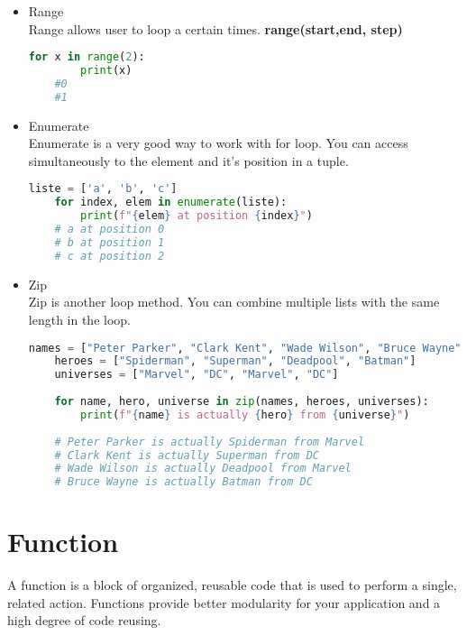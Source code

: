 \documentclass[a4paper, 12pt, titlepage]{scrartcl} %
\begin{document}
\begin{itemize}
    \item Range \\
    Range allows user to loop a certain times. \textbf{range(start,end, step)}
    \begin{lstlisting}[language=Python]
    for x in range(2):
    	print(x)
    #0
    #1
    \end{lstlisting} \vspace{5mm}
    
    \item Enumerate \\
    Enumerate is a very good way to work with for loop. You can access simultaneously to the element and it's position in a tuple.
    \begin{lstlisting}[language=Python]
    liste = ['a', 'b', 'c']
    for index, elem in enumerate(liste):
    	print(f"{elem} at position {index}")
    # a at position 0
    # b at position 1
    # c at position 2
    \end{lstlisting} \vspace{5mm}
    
    \item Zip \\
    Zip is another loop method. You can combine multiple lists with the same length in the loop. 
    \begin{lstlisting}[language=Python]
    names = ["Peter Parker", "Clark Kent", "Wade Wilson", "Bruce Wayne"]
    heroes = ["Spiderman", "Superman", "Deadpool", "Batman"]
    universes = ["Marvel", "DC", "Marvel", "DC"]
    
    for name, hero, universe in zip(names, heroes, universes):
    	print(f"{name} is actually {hero} from {universe}")
    	
    # Peter Parker is actually Spiderman from Marvel
    # Clark Kent is actually Superman from DC
    # Wade Wilson is actually Deadpool from Marvel
    # Bruce Wayne is actually Batman from DC
    \end{lstlisting} \vspace{5mm}
\end{itemize}

\newpage
\section{Function}
\label{sec:Function}
A function is a block of organized, reusable code that is used to perform a single, related action. Functions provide better modularity for your application and a high degree of code reusing.\newline
\end{document}
